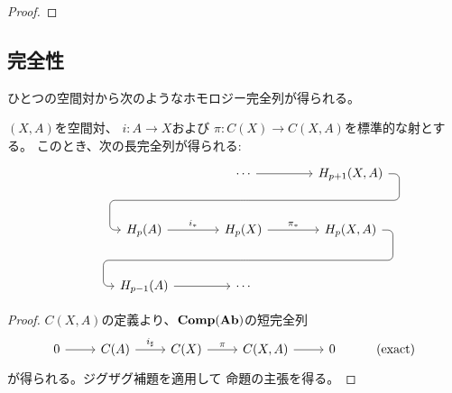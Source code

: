 \documentclass[report]{jlreq}
\begin{document}
\begin{proof}
\end{proof}

\subsection{完全性}

ひとつの空間対から次のようなホモロジー完全列が得られる。

\begin{proposition}[空間対のホモロジー完全列]
    $(X, A)$を空間対、
    $i \colon A \to X$および
    $\pi \colon C(X) \to C(X, A)$を標準的な射とする。
    このとき、次の長完全列が得られる:
    \begin{equation}
        \begin{tikzcd}[column sep=large, row sep=large]
            && \cdots
                \ar{r} \ar[phantom]{d}[name=X1, anchor=center]{}
                & H_{p+1}(X, A)
                    \ar[rounded corners,
                        to path={
                            -- ([xshift=2ex]\tikztostart.east)
                            |- (X1.center) \tikztonodes
                            -| ([xshift=-2ex]\tikztotarget.west)
                            -- (\tikztotarget)
                        }]{dll} \\
            & H_p(A)
                \ar{r}{i_*}
                & H_p(X)
                    \ar{r}{\pi_*}
                    \ar[phantom]{d}[name=X2, anchor=center]{}
                & H_p(X, A)
                    \ar[rounded corners,
                        to path={
                            -- ([xshift=2ex]\tikztostart.east)
                            |- (X2.center) \tikztonodes
                            -| ([xshift=-2ex]\tikztotarget.west)
                            -- (\tikztotarget)
                        }]{dll} \\
            & H_{p-1}(A)
                \ar{r}
                & \cdots
        \end{tikzcd}
    \end{equation}
\end{proposition}

\begin{proof}
    $C(X, A)$の定義より、$\mathbf{Comp}(\mathbf{Ab})$の短完全列
    \begin{equation}
        \begin{tikzcd}
            0 \ar{r}
                & C(A) \ar{r}{i_\sharp}
                & C(X) \ar{r}{\pi}
                & C(X, A) \ar{r}
                & 0
                & (\text{exact})
        \end{tikzcd}
    \end{equation}
    が得られる。ジグザグ補題を適用して
    命題の主張を得る。
\end{proof}
\end{document}
